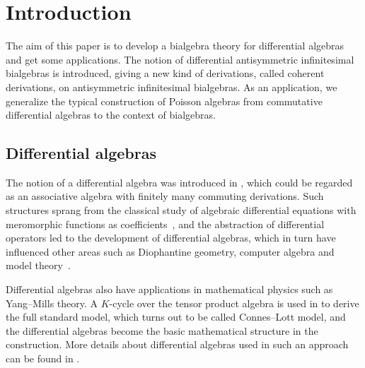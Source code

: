 \documentclass[pdftex]{sigma}
\numberwithin{equation}{section}
\begin{document}


\section{Introduction}

The aim of this paper is to develop a bialgebra theory for differential algebras and get some applications.
The notion of differential antisymmetric infinitesimal bialgebras is introduced,
giving a new kind of derivations, called coherent derivations, on antisymmetric infinitesimal bialgebras.
As an application, we generalize the typical construction of Poisson algebras from commutative differential algebras to the context of bialgebras.

\subsection{Differential algebras}

The notion of a differential algebra was introduced in \cite{Ritt1950Differential},
which could be regarded as an associative algebra with finitely many commuting derivations.
Such structures sprang from the classical study of algebraic differential equations with meromorphic functions as coefficients~\cite{kolchin1973differential},
and the abstraction of differential operators led to the development of differential algebras,
which in turn have influenced other areas such as Diophantine geometry, computer algebra and model theory~\cite{aschenbrenner2017asymptotic, buium1975differential, pillay1995model}.

Differential algebras also have applications in mathematical physics such as Yang--Mills theory.
A $K$-cycle over the tensor product algebra is used in
\cite{connes1992metric} to derive the full standard model, which
turns out to be called Connes--Lott model, and the differential
algebras become the basic mathematical structure in the
construction. More details about differential algebras used in
such an approach can be found in \cite{connes1994non, iochum1996yang, kalau1996hamilton, kalau1995differential, matthes1996structure}.
\end{document}
